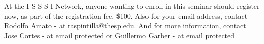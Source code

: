 \documentclass{article}
\begin{document}
At the I S S S I Network, anyone wanting to enroll in this seminar should register now, as part of the registration fee, \$100. Also for your email address, contact Rodolfo Amato - at raspintilla@thesp.edu. And for more information, contact Jose Cortes - at email protected or Guillermo Garber - at email protected
\end{document}
